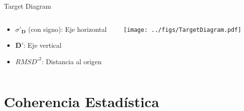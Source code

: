 \documentclass[aspectratio=169, usenames,svgnames,dvipsnames]{beamer}
\begin{document}
\begin{frame}[label={sec:orge6acbcf}]{Target Diagram}
\begin{columns}
\begin{column}{0.3\columnwidth}
\begin{itemize}
\item \(\sigma'_{\mathbf{D}}\) (con signo): Eje horizontal
\item \(\overline{\mathbf{D}}'\): Eje vertical
\item \(RMSD'^2\): Distancia al origen
\end{itemize}
\end{column}

\begin{column}{0.7\columnwidth}
\begin{center}
\texttt{[image: ../figs/TargetDiagram.pdf]}
\end{center}
\end{column}
\end{columns}
\end{frame}


\section{Coherencia Estadística}
\label{sec:org4600b08}
\end{document}
